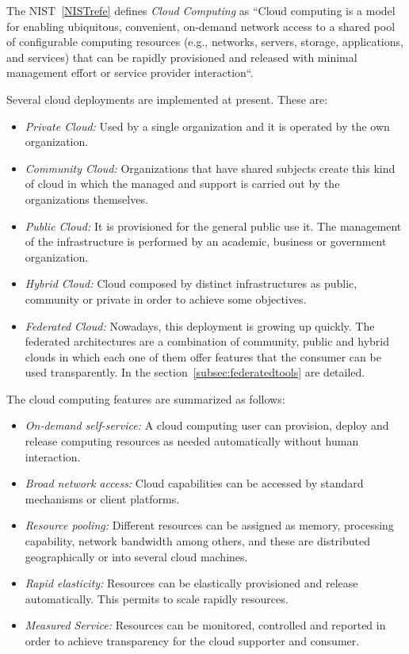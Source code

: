 The NIST~\ref{NISTrefe} defines \emph{Cloud Computing} as ``Cloud computing is a model for enabling ubiquitous, convenient, on-demand network access to a shared 
pool of configurable computing resources (e.g., networks, servers, storage, applications, and services) that 
can be rapidly provisioned and released with minimal management effort or
service provider interaction``.

Several cloud deployments are implemented at present. These are:
\begin{itemize}
\item \emph{Private Cloud:} Used by a single organization and it is operated by
  the own organization. 
\item \emph{Community Cloud:} Organizations that have shared subjects create
  this kind of cloud in which the managed and support is carried out by the
  organizations themselves.
\item \emph{Public Cloud:} It is provisioned for the general public use it. The
  management of the infrastructure is performed by an academic, business or
  government organization.
\item \emph{Hybrid Cloud:} Cloud composed by distinct infrastructures as public,
  community or private in order to achieve some objectives.
\item \emph{Federated Cloud:} Nowadays, this deployment is growing up
  quickly. The federated architectures are a combination of community, public
  and hybrid clouds in which each one of them offer features that the consumer can
  be used transparently. In the section~\ref{subsec:federatedtools} are detailed.
\end{itemize}

The  cloud computing features are summarized as follows:
\begin{itemize}
\item \emph{On-demand self-service:} A cloud computing user can provision,
  deploy and release computing resources as needed automatically without human
  interaction.
\item \emph{Broad network access:} Cloud capabilities can be accessed by
  standard mechanisms or client platforms.
\item \emph{Resource pooling:} Different resources can be assigned as memory,
  processing capability, network bandwidth among others, and these are
  distributed geographically or into several cloud machines. 
\item \emph{Rapid elasticity:} Resources can be elastically provisioned and
  release automatically. This permits to scale rapidly resources.
\item \emph{Measured Service:} Resources can be monitored, controlled and
  reported in order to achieve transparency for the cloud supporter and consumer.
\end{itemize}

